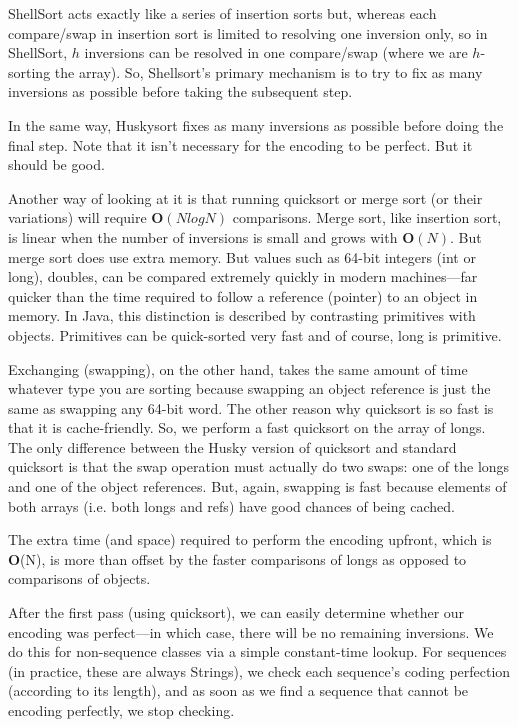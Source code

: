 \documentclass[acmtog]{acmart}
\begin{document}
ShellSort acts exactly like a series of insertion sorts but, whereas each compare/swap in insertion sort is limited to resolving one inversion only, so in ShellSort, $h$ inversions can be resolved in one compare/swap (where we are $h$-sorting the array).
So, Shellsort’s primary mechanism is to try to fix as many inversions as possible before taking the subsequent step.

In the same way, Huskysort fixes as many inversions as possible before doing the final step.
Note that it isn’t necessary for the encoding to be perfect.
But it should be good.

Another way of looking at it is that running quicksort or merge sort (or their variations) will require $\textbf{O}( N log N )$ comparisons.
Merge sort, like insertion sort, is linear when the number of inversions is small and grows with $\textbf{O}(N)$.
But merge sort does use extra memory.
But values such as 64-bit integers (int or long), doubles, can be compared extremely quickly in modern machines—far quicker than the time required to follow a reference (pointer) to an object in memory.
In Java, this distinction is described by contrasting primitives with objects.
Primitives can be quick-sorted very fast and of course, long is primitive.

Exchanging (swapping), on the other hand, takes the same amount of time whatever type you are sorting because swapping an object reference is just the same as swapping any 64-bit word.
The other reason why quicksort is so fast is that it is cache-friendly.
So, we perform a fast quicksort on the array of longs.
The only difference between the Husky version of quicksort and standard quicksort is that the swap operation must actually do two swaps: one of the longs and one of the object references.
But, again, swapping is fast because elements of both arrays (i.e. both longs and refs) have good chances of being cached.

The extra time (and space) required to perform the encoding upfront, which is \textbf{O}(N), is more than offset by the faster comparisons of longs as opposed to comparisons of objects.

After the first pass (using quicksort), we can easily determine whether our encoding was perfect—in which case, there will be no remaining inversions.
We do this for non-sequence classes via a simple constant-time lookup.
For sequences (in practice, these are always Strings), we check each sequence’s coding perfection (according to its length), and as soon as we find a sequence that cannot be encoding perfectly, we stop checking.
\end{document}
